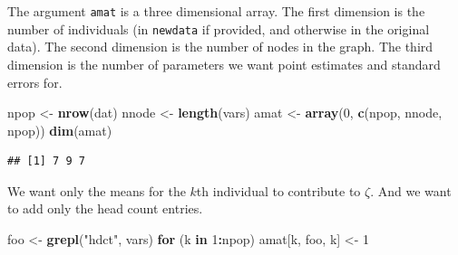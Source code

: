 \documentclass[
  ignorenonframetext,
]{beamer}
\newenvironment{Shaded}{\begin{snugshade}}{\end{snugshade}}
\newcommand{\ControlFlowTok}[1]{\textcolor[rgb]{0.13,0.29,0.53}{\textbf{#1}}}
\newcommand{\DecValTok}[1]{\textcolor[rgb]{0.00,0.00,0.81}{#1}}
\newcommand{\FunctionTok}[1]{\textcolor[rgb]{0.13,0.29,0.53}{\textbf{#1}}}
\newcommand{\NormalTok}[1]{#1}
\newcommand{\OtherTok}[1]{\textcolor[rgb]{0.56,0.35,0.01}{#1}}
\newcommand{\SpecialCharTok}[1]{\textcolor[rgb]{0.81,0.36,0.00}{\textbf{#1}}}
\newcommand{\StringTok}[1]{\textcolor[rgb]{0.31,0.60,0.02}{#1}}
\begin{document}
\begin{frame}[fragile]{}
\protect\hypertarget{section-37}{}
The argument \texttt{amat} is a three dimensional array. The first
dimension is the number of individuals (in \texttt{newdata} if provided,
and otherwise in the original data). The second dimension is the number
of nodes in the graph. The third dimension is the number of parameters
we want point estimates and standard errors for.

\vspace{12pt}
\tiny

\begin{Shaded}
\begin{Highlighting}[]
\NormalTok{npop }\OtherTok{\textless{}{-}} \FunctionTok{nrow}\NormalTok{(dat) }
\NormalTok{nnode }\OtherTok{\textless{}{-}} \FunctionTok{length}\NormalTok{(vars)}
\NormalTok{amat }\OtherTok{\textless{}{-}} \FunctionTok{array}\NormalTok{(}\DecValTok{0}\NormalTok{, }\FunctionTok{c}\NormalTok{(npop, nnode, npop))}
\FunctionTok{dim}\NormalTok{(amat)}
\end{Highlighting}
\end{Shaded}

\begin{verbatim}
## [1] 7 9 7
\end{verbatim}
\end{frame}

\begin{frame}[fragile]{}
\protect\hypertarget{section-38}{}
We want only the means for the \(k\)th individual to contribute to
\(\zeta\). And we want to add only the head count entries.

\vspace{12pt}
\tiny

\begin{Shaded}
\begin{Highlighting}[]
\NormalTok{foo }\OtherTok{\textless{}{-}} \FunctionTok{grepl}\NormalTok{(}\StringTok{"hdct"}\NormalTok{, vars)}
\ControlFlowTok{for}\NormalTok{ (k }\ControlFlowTok{in} \DecValTok{1}\SpecialCharTok{:}\NormalTok{npop) amat[k, foo, k] }\OtherTok{\textless{}{-}} \DecValTok{1}
\end{Highlighting}
\end{Shaded}
\end{frame}
\end{document}
